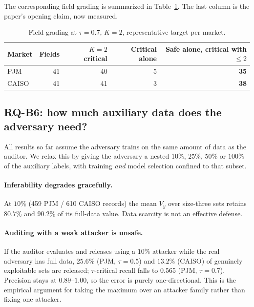 \documentclass[preprint,12pt]{elsarticle}
\newcommand{\Vy}{V_{y}}
\begin{document}
The corresponding field grading is summarized in Table~\ref{tab:grading}. The last column is
the paper's opening claim, now measured.

\begin{table}[t]
\centering
\caption{Field grading at $\tau=0.7$, $K=2$, representative target per market.}
\label{tab:grading}
\small
\begin{tabular}{lrrrr}
\toprule
Market & Fields & $K{=}2$ critical & Critical alone & \textbf{Safe alone, critical with $\le 2$} \\
\midrule
PJM   & 41 & 40 & 5 & \textbf{35} \\
CAISO & 41 & 41 & 3 & \textbf{38} \\
\bottomrule
\end{tabular}
\end{table}

\subsection{RQ-B6: how much auxiliary data does the adversary need?}\label{sec:exp-naux}
All results so far assume the adversary trains on the same amount of data as the auditor.
We relax this by giving the adversary a nested $10\%$, $25\%$, $50\%$ or $100\%$ of the
auxiliary labels, with training \emph{and} model selection confined to that subset.

\paragraph{Inferability degrades gracefully.}
At $10\%$ (459 PJM / 610 CAISO records) the mean $\Vy$ over size-three sets retains $80.7\%$
and $90.2\%$ of its full-data value. Data scarcity is not an effective defense.

\paragraph{Auditing with a weak attacker is unsafe.}
If the auditor evaluates and releases using a $10\%$ attacker while the real adversary has
full data, $25.6\%$ (PJM, $\tau{=}0.5$) and $13.2\%$ (CAISO) of genuinely exploitable sets
are released; $\tau$-critical recall falls to $0.565$ (PJM, $\tau{=}0.7$). Precision stays
at $0.89$--$1.00$, so the error is purely one-directional. This is the empirical argument for
taking the maximum over an attacker family rather than fixing one attacker.
\end{document}
